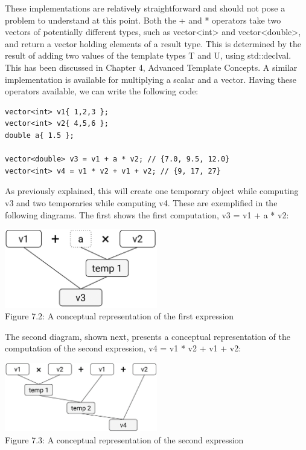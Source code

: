 These implementations are relatively straightforward and should not pose a problem to understand at this point. Both the + and * operators take two vectors of potentially different types, such as vector<int> and vector<double>, and return a vector holding elements of a result type. This is determined by the result of adding two values of the template types T and U, using std::declval. This has been discussed in Chapter 4, Advanced Template Concepts. A similar implementation is available for multiplying a scalar and a vector. Having these operators available, we can write the following code:

\begin{lstlisting}[style=styleCXX]
vector<int> v1{ 1,2,3 };
vector<int> v2{ 4,5,6 };
double a{ 1.5 };

vector<double> v3 = v1 + a * v2; // {7.0, 9.5, 12.0}
vector<int> v4 = v1 * v2 + v1 + v2; // {9, 17, 27}
\end{lstlisting}

As previously explained, this will create one temporary object while computing v3 and two temporaries while computing v4. These are exemplified in the following diagrams. The first shows the first computation, v3 = v1 + a * v2:

\begin{center}
\includegraphics[width=0.5\textwidth]{content/3/chapter7/images/2.png}\\
Figure 7.2: A conceptual representation of the first expression
\end{center}

The second diagram, shown next, presents a conceptual representation of the computation of the second expression, v4 = v1 * v2 + v1 + v2:

\begin{center}
\includegraphics[width=0.5\textwidth]{content/3/chapter7/images/3.png}\\
Figure 7.3: A conceptual representation of the second expression
\end{center}

